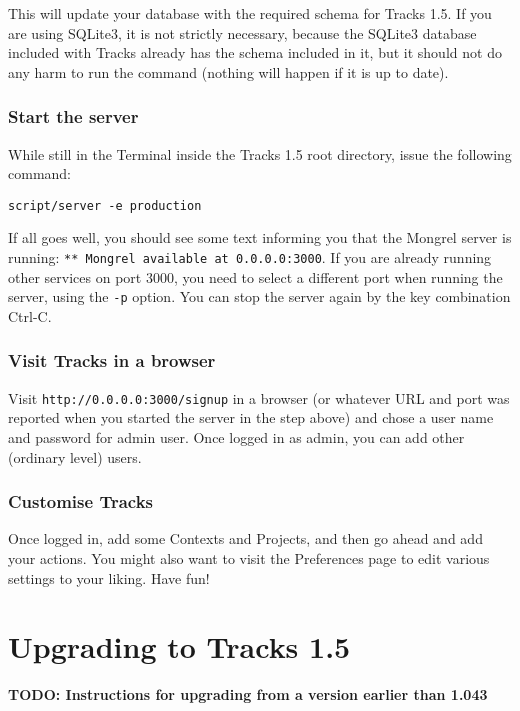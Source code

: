\documentclass[10pt,twoside]{memoir}
\begin{document}
This will update your database with the required schema for Tracks 1.5. If you are using SQLite3, it is not strictly necessary, because the SQLite3 database included with Tracks already has the schema included in it, but it should not do any harm to run the command (nothing will happen if it is up to date).


\subsection{Start the server}
\label{startserver_install}

While still in the Terminal inside the Tracks 1.5 root directory, issue the following command:


\texttt{script/server -e production}


If all goes well, you should see some text informing you that the Mongrel server is running: \texttt{** Mongrel available at 0.0.0.0:3000}. If you are already running other services on port 3000, you need to select a different port when running the server, using the \texttt{-p} option. You can stop the server again by the key combination Ctrl-C.


\subsection{Visit Tracks in a browser}
\label{signup_install}

Visit \texttt{http://0.0.0.0:3000/signup} in a browser (or whatever URL and port was reported when you started the server in the step above) and chose a user name and password for admin user. Once logged in as admin, you can add other (ordinary level) users.


\subsection{Customise Tracks}
\label{customise_install}

Once logged in, add some Contexts and Projects, and then go ahead and add your actions. You might also want to visit the Preferences page to edit various settings to your liking. Have fun!


\chapter{Upgrading to Tracks 1.5}
\label{upgrading}

\textbf{TODO: Instructions for upgrading from a version earlier than 1.043}
\end{document}
